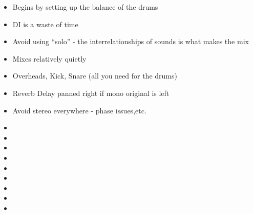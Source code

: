 \documentclass{article}
\begin{document}
\begin{itemize}
\item Begins by setting up the balance of the drums
\item DI is a waste of time
\item Avoid using ``solo'' - the interrelationships of sounds is what makes the mix
\item Mixes relatively quietly 
\item Overheads, Kick, Snare (all you need for the drums)
\item Reverb Delay panned right if mono original is left 
\item Avoid stereo everywhere - phase issues,etc.
\item 
\item 
\item
\item 
\item 
\item 
\item 
\item 
\item
\end{itemize}
\end{document}
